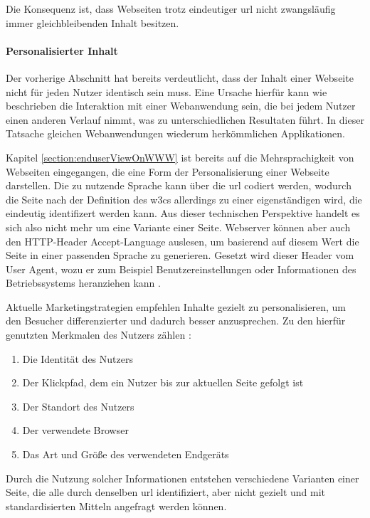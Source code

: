         Die Konsequenz ist, dass Webseiten trotz eindeutiger \gls{url} nicht zwangsläufig
        immer gleichbleibenden Inhalt besitzen.

        \paragraph*{Personalisierter Inhalt}
        Der vorherige Abschnitt hat bereits verdeutlicht,
        dass der Inhalt einer Webseite nicht für jeden Nutzer identisch sein muss.
        Eine Ursache hierfür kann wie beschrieben die Interaktion mit
        einer Webanwendung sein, die bei jedem Nutzer einen anderen Verlauf nimmt,
        was zu unterschiedlichen Resultaten führt.
        In dieser Tatsache gleichen Webanwendungen wiederum herkömmlichen Applikationen.

        Kapitel \ref{section:enduserViewOnWWW} ist bereits auf die Mehrsprachigkeit
        von Webseiten eingegangen, die eine Form der Personalisierung einer Webseite darstellen.
        Die zu nutzende Sprache kann über die \gls{url} codiert werden,
        wodurch die Seite nach der Definition des \glspl{w3c} allerdings zu einer eigenständigen {\resource} wird,
        die eindeutig identifizert werden kann.
        Aus dieser technischen Perspektive handelt es sich also nicht mehr um eine Variante einer Seite.
        Webserver können aber auch den HTTP-Header Accept-Language auslesen,
        um basierend auf diesem Wert die Seite in einer passenden Sprache zu generieren.
        Gesetzt wird dieser Header vom User Agent,
        wozu er zum Beispiel Benutzereinstellungen oder Informationen des Betriebssystems heranziehen kann
        \cite[Kapitel 5.3.5, Seite 42]{rfc:7231}.

        Aktuelle Marketingstrategien empfehlen Inhalte gezielt zu personalisieren,
        um den Besucher differenzierter und dadurch besser anzusprechen.
        Zu den hierfür genutzten Merkmalen des Nutzers zählen
        \cite{narongsak:contentPers}:
        
        \begin{enumerate}
            \item Die Identität des Nutzers
            \item Der Klickpfad, dem ein Nutzer bis zur aktuellen Seite gefolgt ist
            \item Der Standort des Nutzers
            \item Der verwendete Browser
            \item Das Art und Größe des verwendeten Endgeräts
        \end{enumerate}

        Durch die Nutzung solcher Informationen entstehen verschiedene Varianten einer Seite,
        die alle durch denselben \gls{url} identifiziert, aber nicht gezielt und mit standardisierten Mitteln
        angefragt werden können.